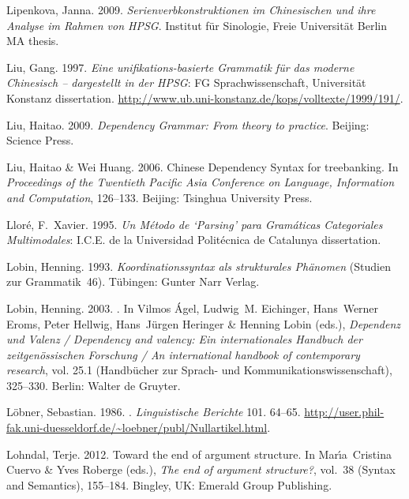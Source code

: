 \begin{thebibliography}{1420}
Lipenkova, Janna. 2009.
\newblock \emph{{Serienverbkonstruktionen im Chinesischen und ihre Analyse im
  Rahmen von HPSG}}.
\newblock Institut f{\"u}r Sinologie, Freie Universit{\"a}t Berlin MA thesis.

Liu, Gang. 1997.
\newblock \emph{{Eine unifikations-basierte Grammatik f{\"u}r das moderne
  Chinesisch -- dargestellt in der HPSG}}: FG Sprachwissenschaft,
  Universit{\"a}t Konstanz dissertation.
\newblock
  \urlprefix\url{http://www.ub.uni-konstanz.de/kops/volltexte/1999/191/}.

Liu, Haitao. 2009.
\newblock \emph{{Dependency Grammar}: {From} theory to practice}.
\newblock Beijing: Science Press.

Liu, Haitao \& Wei Huang. 2006.
\newblock Chinese {Dependency Syntax} for treebanking.
\newblock In \emph{Proceedings of the {Twentieth Pacific Asia Conference on
  Language, Information and Computation}}, 126--133. Beijing: Tsinghua
  University Press.

Llor{\'e}, F.~Xavier. 1995.
\newblock \emph{{Un M{\'e}todo de `Parsing' para Gram{\'a}ticas Categoriales
  Multimodales}}: I.C.E. de la Universidad Polit{\'e}cnica de Catalunya
  dissertation.

Lobin, Henning. 1993.
\newblock \emph{{Koordinationssyntax als strukturales Ph{\"a}nomen}} (Studien
  zur Grammatik~46).
\newblock T\"u\-bing\-en: Gunter Narr Verlag.

Lobin, Henning. 2003.
.
\newblock In Vilmos {\'A}gel, Ludwig~M. Eichinger, Hans~Werner Eroms, Peter
  Hellwig, Hans~J{\"u}rgen Heringer \& Henning Lobin (eds.), \emph{{Dependenz
  und Valenz} / {Dependency} and valency: {Ein internationales Handbuch der
  zeitgen{\"o}ssischen Forschung} / {An} international handbook of contemporary
  research}, vol. 25.1  (Hand\-b{\"u}\-cher zur Sprach- und
  Kommunikationswissenschaft), 325--330. Berlin: Walter de Gruyter.

L{\"o}bner, Sebastian. 1986.
.
\newblock \emph{Linguistische Berichte} 101. 64--65.
\newblock
  \urlprefix\url{http://user.phil-fak.uni-duesseldorf.de/~loebner/publ/Nullartikel.html}.

Lohndal, Terje. 2012.
\newblock Toward the end of argument structure.
\newblock In Mar{\'\i}a~Cristina Cuervo \& Yves Roberge (eds.), \emph{The end
  of argument structure?}, vol.~38  (Syntax and Semantics), 155--184. Bingley,
  UK: Emerald Group Publishing.


\end{thebibliography}
